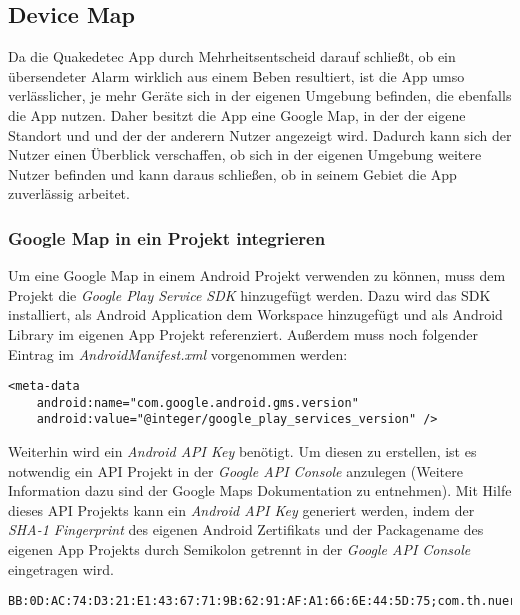 \subsection{Device Map}
\nocite{GoogleMapsAPI}
Da die Quakedetec App durch Mehrheitsentscheid darauf schließt, ob ein übersendeter Alarm wirklich aus einem Beben resultiert, ist die App umso verlässlicher, je mehr Geräte sich in der eigenen Umgebung befinden, die ebenfalls die App nutzen. Daher besitzt die App eine Google Map, in der der eigene Standort und und der der anderern Nutzer angezeigt wird. Dadurch kann sich der Nutzer einen Überblick verschaffen, ob sich in der eigenen Umgebung weitere Nutzer befinden und kann daraus schließen, ob in seinem Gebiet die App zuverlässig arbeitet.

\subsubsection{Google Map in ein Projekt integrieren}
Um eine Google Map in einem Android Projekt verwenden zu können, muss dem Projekt die \textit{Google Play Service SDK} hinzugefügt werden. Dazu wird das SDK installiert, als Android Application dem Workspace hinzugefügt und als Android Library im eigenen App Projekt referenziert. Außerdem muss noch folgender Eintrag im \textit{AndroidManifest.xml} vorgenommen werden:
\bigskip
\begin{lstlisting}[caption={Google Map AndroidManifest.xml Eintrag},label=lst:MapInsertManifest]
<meta-data
    android:name="com.google.android.gms.version"
    android:value="@integer/google_play_services_version" />
\end{lstlisting}
\par\bigskip
Weiterhin wird ein \textit{Android API Key} benötigt. Um diesen zu erstellen, ist es notwendig ein API Projekt in der \textit{Google API Console} anzulegen (Weitere Information dazu sind der Google Maps Dokumentation zu entnehmen). Mit Hilfe dieses API Projekts kann ein \textit{Android API Key} generiert werden, indem der \textit{SHA-1 Fingerprint} des eigenen Android Zertifikats und der Packagename des eigenen App Projekts durch Semikolon getrennt in der \textit{Google API Console} eingetragen wird.
\bigskip
\begin{lstlisting}[caption={Android API Key generieren},label=lst:AndroidApiKey, basicstyle=\small]
BB:0D:AC:74:D3:21:E1:43:67:71:9B:62:91:AF:A1:66:6E:44:5D:75;com.th.nuernberg.itp.earthquakedetection
\end{lstlisting}


